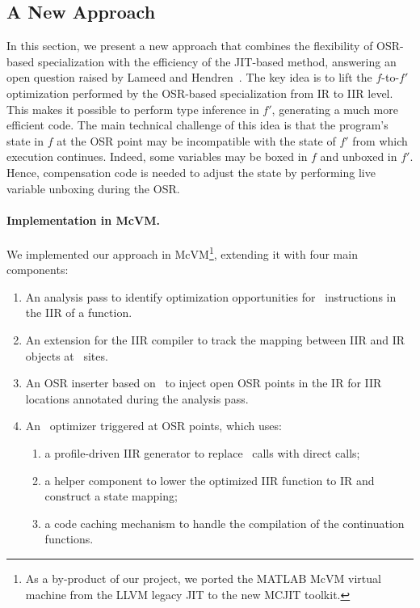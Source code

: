 
\subsection{A New Approach}
\label{ss:eval-opt-mcvm}

In this section, we present a new approach that combines the flexibility of OSR-based specialization with the efficiency of the JIT-based method, answering an open question raised by Lameed and Hendren~\cite{lameed2013feval}. The key idea is to lift the $f$-to-$f'$ optimization performed by the OSR-based specialization from IR to IIR level. This makes it possible to perform type inference in $f'$, generating a much more efficient code. The main technical challenge of this idea is that the program's state in $f$ at the OSR point may be incompatible with the state of $f'$ from which execution continues. Indeed, some variables may be boxed in $f$ and unboxed in $f'$. Hence, compensation code is needed to adjust the state by performing live variable unboxing during the OSR.



\paragraph{Implementation in McVM.}
We implemented our approach in McVM\footnote{As a by-product of our project, we ported the MATLAB McVM virtual machine from the LLVM legacy JIT to the new MCJIT toolkit.}, extending it with four main components:

\begin{enumerate}
\item An analysis pass to identify optimization opportunities for \feval\ instructions in the IIR of a function.
\item An extension for the IIR compiler to track the mapping between IIR and IR objects at \feval\ sites.
\item An OSR inserter based on \osrkit\ to inject open OSR points in the IR for IIR locations annotated during the analysis pass.
\item An \feval\ optimizer triggered at OSR points, which uses:
\begin{enumerate}[noitemsep]
\item a profile-driven IIR generator to replace \feval\ calls with direct calls;
\item a helper component to lower the optimized IIR function to IR and construct a state mapping;
\item a code caching mechanism to handle the compilation of the continuation functions.
\end{enumerate}
\end{enumerate}

